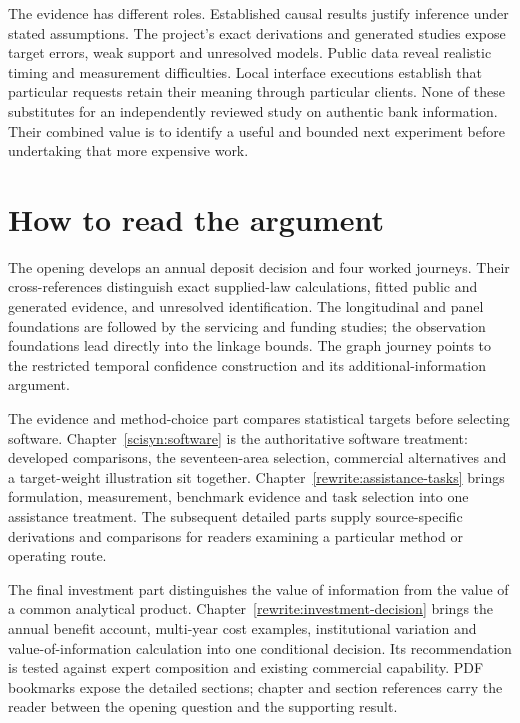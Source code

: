 The evidence has different roles. Established causal results justify inference
under stated assumptions. The project's exact derivations and generated studies
expose target errors, weak support and unresolved models. Public data reveal
realistic timing and measurement difficulties. Local interface executions
establish that particular requests retain their meaning through particular
clients. None of these substitutes for an independently reviewed study on
authentic bank information. Their combined value is to identify a useful and
bounded next experiment before undertaking that more expensive work.

\chapter*{How to read the argument}

The opening develops an annual deposit decision and four worked journeys.
Their cross-references distinguish exact supplied-law calculations, fitted
public and generated evidence, and unresolved identification. The longitudinal
and panel foundations are followed by the servicing and funding studies;
the observation foundations lead directly into the linkage bounds. The graph
journey points to the restricted temporal confidence construction and its
additional-information argument.

The evidence and method-choice part compares statistical targets before
selecting software. Chapter~\ref{scisyn:software} is the authoritative
software treatment: developed comparisons, the seventeen-area selection,
commercial alternatives and a target-weight illustration sit together.
Chapter~\ref{rewrite:assistance-tasks} brings formulation, measurement,
benchmark evidence and task selection into one assistance treatment.
The subsequent detailed parts supply source-specific derivations and
comparisons for readers examining a particular method or operating route.

The final investment part distinguishes the value of information from the
value of a common analytical product. Chapter~\ref{rewrite:investment-decision}
brings the annual benefit account, multi-year cost examples, institutional
variation and value-of-information calculation into one conditional decision.
Its recommendation is tested against expert composition and existing
commercial capability. PDF bookmarks expose the detailed sections; chapter
and section references carry the reader between the opening question and
the supporting result.

